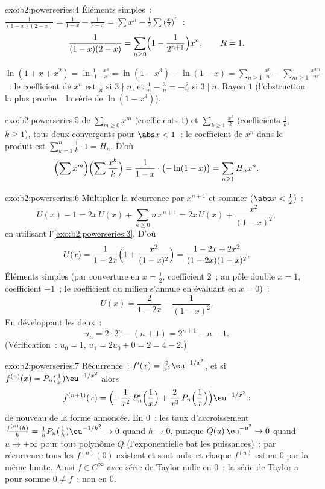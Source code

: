 \begin{solution}{exo:b2:powerseries:4}
Éléments simples~: $\frac{1}{(1-x)(2-x)} = \frac{1}{1-x} -
\frac{1}{2 - x} = \sum x^n - \frac12\sum \bigl(\frac x2\bigr)^n$~:
\[
\frac{1}{(1-x)(2-x)} = \sum_{n\geq0} \Bigl(1 -
\frac{1}{2^{n+1}}\Bigr)x^n,
\qquad R = 1 .
\]

$\ln(1 + x + x^2) = \ln\frac{1 - x^3}{1 - x} = \ln(1 - x^3) -
\ln(1 - x) = \sum_{n\geq1}\frac{x^n}{n} -
\sum_{m\geq1}\frac{x^{3m}}{m}$~: le coefficient de $x^n$ est
$\frac1n$ si $3 \nmid n$, et $\frac1n - \frac{3}{n} = -\frac2n$ si
$3 \mid n$. Rayon $1$ (l'obstruction la plus proche~: la série de
$\ln(1-x^3)$).
\end{solution}

\begin{solution}{exo:b2:powerseries:5}
 de $\sum_{m \geq 0} x^m$ (coefficients $1$) et
$\sum_{k\geq1} \frac{x^k}{k}$ (coefficients $\frac1k$, $k \geq
1$), tous deux  convergents pour $\abs x < 1$~: le coefficient
de $x^n$ dans le produit est $\sum_{k=1}^{n} \frac1k \cdot 1 = H_n$.
D'où
\[
\Bigl(\sum x^m\Bigr)\Bigl(\sum \frac{x^k}{k}\Bigr)
= \frac{1}{1-x}\cdot\bigl(-\ln(1-x)\bigr)
= \sum_{n\geq1} H_n x^n .
\]
\end{solution}

\begin{solution}{exo:b2:powerseries:6}
Multiplier la récurrence par $x^{n+1}$ et sommer ($\abs x <
\frac12$)~:
\[
U(x) - 1 = 2x\,U(x) + \sum_{n\geq0} n\,x^{n+1}
= 2x\,U(x) + \frac{x^2}{(1-x)^2} ,
\]
en utilisant l'\cref{exo:b2:powerseries:3}. D'où
\[
U(x) = \frac{1}{1 - 2x}\Bigl(1 + \frac{x^2}{(1-x)^2}\Bigr)
= \frac{1 - 2x + 2x^2}{(1-2x)(1-x)^2} .
\]
Éléments simples (par couverture en $x = \frac12$, coefficient $2$~;
au pôle double $x = 1$, coefficient $-1$~; le coefficient du milieu
s'annule en évaluant en $x = 0$)~:
\[
U(x) = \frac{2}{1-2x} - \frac{1}{(1 - x)^2} .
\]
En développant les deux~:
\[
u_n = 2\cdot 2^n - (n + 1) = 2^{n+1} - n - 1 .
\]
(Vérification~: $u_0 = 1$, $u_1 = 2u_0 + 0 = 2 = 4 - 2$.)
\end{solution}

\begin{solution}{exo:b2:powerseries:7}
Récurrence~: $f'(x) = \frac{2}{x^3}\eu^{-1/x^2}$, et si $f^{(n)}(x)
= P_n(\tfrac1x)\eu^{-1/x^2}$ alors
\[
f^{(n+1)}(x) =
\Bigl(-\frac{1}{x^2}\,P_n'\Bigl(\frac1x\Bigr) +
\frac{2}{x^3}\,P_n\Bigl(\frac1x\Bigr)\Bigr)\eu^{-1/x^2} :
\]
de nouveau de la forme annoncée. En $0$~: les taux d'accroissement $\frac{f^{(n)}(h)}{h} =
\frac1h P_n(\frac1h)\eu^{-1/h^2} \to 0$ quand $h \to 0$, puisque
$Q(u)\,\eu^{-u^2} \to 0$ quand $u \to \pm\infty$ pour tout polynôme
$Q$ (l'exponentielle bat les puissances)~: par récurrence tous les $f^{(n)}(0)$ existent
et sont nuls, et chaque $f^{(n)}$ est  en $0$ par la même
limite. Ainsi $f \in C^\infty$ avec série de Taylor nulle en $0$~; la
série de Taylor a pour somme $0 \neq f$~: non  en $0$.
\end{solution}

